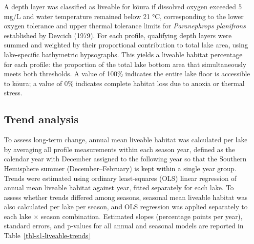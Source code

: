 \documentclass[
  12pt,
  a4paper,
  oneside]{scrbook}
\begin{document}
A depth layer was classified as liveable for kōura if dissolved oxygen
exceeded 5 mg/L and water temperature remained below 21 °C,
corresponding to the lower oxygen tolerance and upper thermal tolerance
limits for \emph{Paranephrops planifrons} established by Devcich (1979).
For each profile, qualifying depth layers were summed and weighted by
their proportional contribution to total lake area, using lake-specific
bathymetric hypsographs. This yields a liveable habitat percentage for
each profile: the proportion of the total lake bottom area that
simultaneously meets both thresholds. A value of 100\% indicates the
entire lake floor is accessible to kōura; a value of 0\% indicates
complete habitat loss due to anoxia or thermal stress.

\subsection{Trend analysis}\label{trend-analysis}

To assess long-term change, annual mean liveable habitat was calculated
per lake by averaging all profile measurements within each season year,
defined as the calendar year with December assigned to the following
year so that the Southern Hemisphere summer (December--February) is kept
within a single year group. Trends were estimated using ordinary
least-squares (OLS) linear regression of annual mean liveable habitat
against year, fitted separately for each lake. To assess whether trends
differed among seasons, seasonal mean liveable habitat was also
calculated per lake per season, and OLS regression was applied
separately to each lake × season combination. Estimated slopes
(percentage points per year), standard errors, and p-values for all
annual and seasonal models are reported in
Table~\ref{tbl-s1-liveable-trends}

\begingroup\fontsize{8}{10}\selectfont
\end{document}
